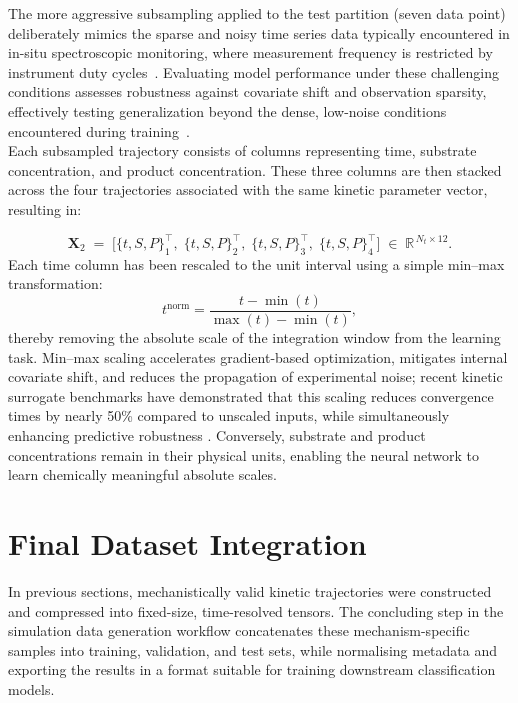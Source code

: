 \documentclass{dissertation}
\begin{document}
The more aggressive subsampling applied to the test partition (seven data point) deliberately mimics the sparse and noisy time series data typically encountered in in-situ spectroscopic monitoring, where measurement frequency is restricted by instrument duty cycles~\cite{Lim2021}. Evaluating model performance under these challenging conditions assesses robustness against covariate shift and observation sparsity, effectively testing generalization beyond the dense, low-noise conditions encountered during training~\cite{Appleby2024}.\\

Each subsampled trajectory consists of columns representing time, substrate concentration, and product concentration. These three columns are then stacked across the four trajectories associated with the same kinetic parameter vector, resulting in:

\begin{equation}
\mathbf{X}_{2} \;=\;
\bigl[
\{t,S,P\}^{\!\top}_{1}\!,
\;
\{t,S,P\}^{\!\top}_{2}\!,
\;
\{t,S,P\}^{\!\top}_{3}\!,
\;
\{t,S,P\}^{\!\top}_{4}
\bigr]
\;\in\;
\mathbb{R}^{\,N_t\times 12}.
\end{equation}
Each time column has been rescaled to the unit interval using a simple min–max transformation:
\begin{equation}
t^{\mathrm{norm}} = \frac{t - \min(t)}{\max(t)-\min(t)},
\end{equation}
thereby removing the absolute scale of the integration window from the learning task. Min–max scaling accelerates gradient-based optimization, mitigates internal covariate shift, and reduces the propagation of experimental noise; recent kinetic surrogate benchmarks have demonstrated that this scaling reduces convergence times by nearly 50\% compared to unscaled inputs, while simultaneously enhancing predictive robustness \cite{Dong2025}. Conversely, substrate and product concentrations remain in their physical units, enabling the neural network to learn chemically meaningful absolute scales.

\section{Final Dataset Integration}
\label{sec:final_dataset_integration}

In previous sections, mechanistically valid kinetic trajectories were constructed and compressed into fixed-size, time-resolved tensors. The concluding step in the simulation data generation workflow concatenates these mechanism-specific samples into training, validation, and test sets, while normalising metadata and exporting the results in a format suitable for training downstream classification models.\\
\end{document}
